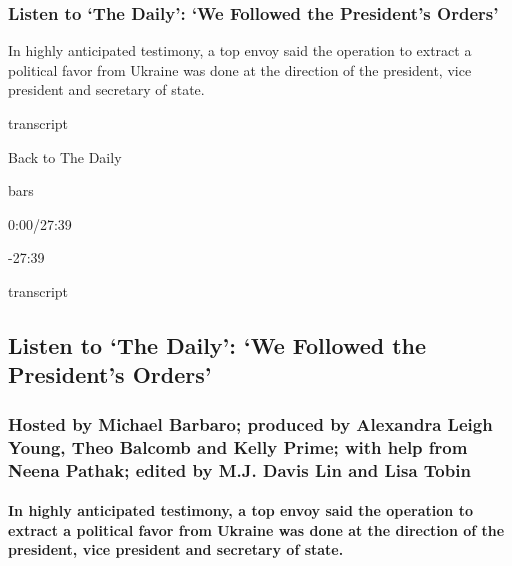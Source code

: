 \hypertarget{listen-to-the-daily-we-followed-the-presidents-orders}{%
\subsubsection{Listen to `The Daily': `We Followed the President's
Orders'}\label{listen-to-the-daily-we-followed-the-presidents-orders}}

In highly anticipated testimony, a top envoy said the operation to
extract a political favor from Ukraine was done at the direction of the
president, vice president and secretary of state.

transcript

Back to The Daily

bars

0:00/27:39

-27:39

transcript

\hypertarget{listen-to-the-daily-we-followed-the-presidents-orders-1}{%
\subsection{Listen to `The Daily': `We Followed the President's
Orders'}\label{listen-to-the-daily-we-followed-the-presidents-orders-1}}

\hypertarget{hosted-by-michael-barbaro-produced-by-alexandra-leigh-young-theo-balcomb-and-kelly-prime-with-help-from-neena-pathak-edited-by-mj-davis-lin-and-lisa-tobin}{%
\subsubsection{Hosted by Michael Barbaro; produced by Alexandra Leigh
Young, Theo Balcomb and Kelly Prime; with help from Neena Pathak; edited
by M.J. Davis Lin and Lisa
Tobin}\label{hosted-by-michael-barbaro-produced-by-alexandra-leigh-young-theo-balcomb-and-kelly-prime-with-help-from-neena-pathak-edited-by-mj-davis-lin-and-lisa-tobin}}

\hypertarget{in-highly-anticipated-testimony-a-top-envoy-said-the-operation-to-extract-a-political-favor-from-ukraine-was-done-at-the-direction-of-the-president-vice-president-and-secretary-of-state}{%
\paragraph{In highly anticipated testimony, a top envoy said the
operation to extract a political favor from Ukraine was done at the
direction of the president, vice president and secretary of
state.}\label{in-highly-anticipated-testimony-a-top-envoy-said-the-operation-to-extract-a-political-favor-from-ukraine-was-done-at-the-direction-of-the-president-vice-president-and-secretary-of-state}}

